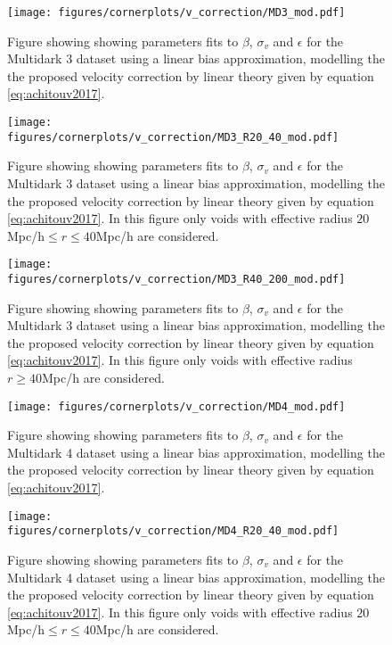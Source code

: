 \begin{figure}[htbp]\label{fig:linbiasMD3mod}
    \texttt{[image: figures/cornerplots/v\_correction/MD3\_mod.pdf]}
    \caption{Figure showing showing parameters fits to $\beta$, $\sigma_v$ and $\epsilon$ for the Multidark 3 dataset using a linear bias approximation, modelling the the proposed velocity correction by \cite{Achitouv_streaming} linear theory given by equation \ref{eq:achitouv2017}.}
\end{figure}

\begin{figure}[htbp]\label{fig:linbiasMD3modR2040}
    \texttt{[image: figures/cornerplots/v\_correction/MD3\_R20\_40\_mod.pdf]}
    \caption{Figure showing showing parameters fits to $\beta$, $\sigma_v$ and $\epsilon$ for the Multidark 3 dataset using a linear bias approximation, modelling the the proposed velocity correction by \cite{Achitouv_streaming} linear theory given by equation \ref{eq:achitouv2017}. In this figure only voids with effective radius $20$Mpc/h$\leq r \leq 40$Mpc/h are considered.}
\end{figure}

\begin{figure}[htbp]\label{fig:linbiasMD3modR40}
    \texttt{[image: figures/cornerplots/v\_correction/MD3\_R40\_200\_mod.pdf]}
    \caption{Figure showing showing parameters fits to $\beta$, $\sigma_v$ and $\epsilon$ for the Multidark 3 dataset using a linear bias approximation, modelling the the proposed velocity correction by \cite{Achitouv_streaming} linear theory given by equation \ref{eq:achitouv2017}. In this figure only voids with effective radius $r \geq 40$Mpc/h are considered.}
\end{figure}


\begin{figure}[htbp]\label{fig:linbiasMD4mod}
    \texttt{[image: figures/cornerplots/v\_correction/MD4\_mod.pdf]}
    \caption{Figure showing showing parameters fits to $\beta$, $\sigma_v$ and $\epsilon$ for the Multidark 4 dataset using a linear bias approximation, modelling the the proposed velocity correction by \cite{Achitouv_streaming} linear theory given by equation \ref{eq:achitouv2017}.}
\end{figure}

\begin{figure}[htbp]\label{fig:linbiasMD4modR2040}
    \texttt{[image: figures/cornerplots/v\_correction/MD4\_R20\_40\_mod.pdf]}
    \caption{Figure showing showing parameters fits to $\beta$, $\sigma_v$ and $\epsilon$ for the Multidark 4 dataset using a linear bias approximation, modelling the the proposed velocity correction by \cite{Achitouv_streaming} linear theory given by equation \ref{eq:achitouv2017}. In this figure only voids with effective radius $20$Mpc/h$\leq r \leq 40$Mpc/h are considered.}
\end{figure}

